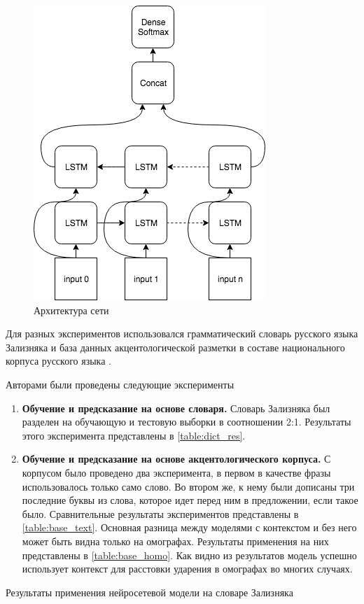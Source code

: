 \documentclass[14pt, a4paper, russian]{report}
\begin{document}
\begin{normalsize}
\begin{figure}[H]
	\begin{center}
		\includegraphics[width=0.5\linewidth]{Baseline}
	\end{center}
	\caption{\small{Архитектура сети}}
	\label{fig:base_global}
\end{figure}

Для разных экспериментов использовался грамматический словарь русского языка Зализняка \cite{zaliz} и база данных акцентологической разметки в составе национального корпуса русского языка \cite{grishina}. 

Авторами были проведены следующие эксперименты
\begin{enumerate}
	\item \textbf{Обучение и предсказание на основе словаря.} Словарь Зализняка был разделен на обучающую и тестовую выборки в соотношении 2:1. Результаты этого эксперимента представлены в \cref{table:dict_res}.
	\item \textbf{Обучение и предсказание на основе акцентологического корпуса.} С корпусом было проведено два эксперимента, в первом в качестве фразы использовалось только само слово. Во втором же, к нему были дописаны три последние буквы из слова, которое идет перед ним в предложении, если такое было. Сравнительные результаты экспериментов представлены в \cref{table:base_text}. Основная разница между моделями с контекстом и без него может быть видна только на омографах. Результаты применения на них представлены в \cref{table:base_homo}. Как видно из результатов модель успешно использует контекст для расстовки ударения в омографах во многих случаях.
\end{enumerate}

\begin{table}[H]
		\caption{Результаты применения нейросетевой модели на словаре Зализняка}
	

\end{table}
\end{normalsize}
\end{document}
